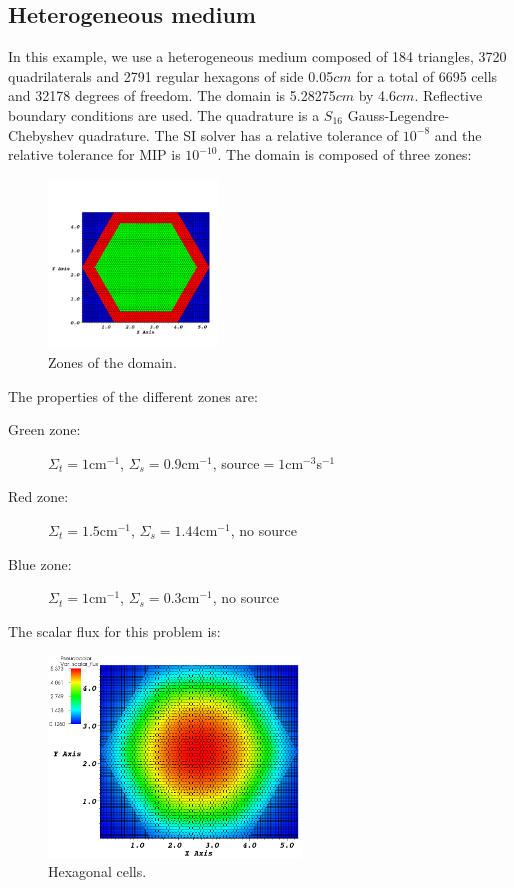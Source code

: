 \subsection{Heterogeneous medium}
In this example, we use a heterogeneous medium composed of 184 triangles, 3720
quadrilaterals and 2791 regular hexagons of side 0.05$cm$ for a total of 6695 
cells and 32178 degrees of freedom. The domain is 5.28275$cm$ by 4.6$cm$. 
Reflective boundary conditions are used. The quadrature is a $S_{16}$ 
Gauss-Legendre-Chebyshev quadrature. The SI solver has a relative tolerance of 
$10^{-8}$ and the relative tolerance for MIP is $10^{-10}$. The domain is 
composed of three zones:
\begin{figure}[H]
\centering
\includegraphics[width=0.4\textwidth]{./Dsa/source_crop}
\caption{Zones of the domain.}
\end{figure}
The properties of the different zones are:
\begin{description}
\item[Green zone:] $\Sigma_t =1$cm$^{-1}$, $\Sigma_s = 0.9$cm$^{-1}$, source$ =
1$cm$^{-3}$s$^{-1}$
\item[Red zone:] $\Sigma_t = 1.5$cm$^{-1}$, $\Sigma_s = 1.44$cm$^{-1}$, no source
\item[Blue zone:] $\Sigma_t = 1$cm$^{-1}$, $\Sigma_s = 0.3$cm$^{-1}$, no source
\end{description}
The scalar flux for this problem is:
\begin{figure}[H]
\centering
\includegraphics[width=0.6\textwidth]{./Dsa/heterog_hex_crop}
\caption{Hexagonal cells.}
\end{figure}
